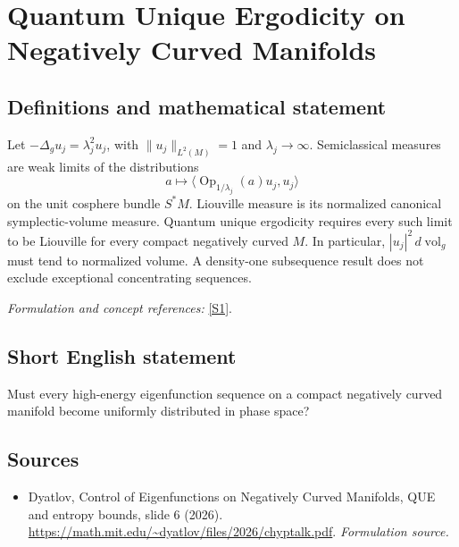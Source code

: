 \documentclass[11pt]{article}
\begin{document}
\section*{\texorpdfstring{Quantum Unique Ergodicity on Negatively Curved Manifolds}{Quantum Unique Ergodicity on Negatively Curved Manifolds}}\label{statement}
\subsection{Definitions and mathematical statement}
Let $-\Delta_g u_j=\lambda_j^2u_j$, with $\|u_j\|_{L^2(M)}=1$ and $\lambda_j\to\infty$. Semiclassical measures are weak limits of the distributions
\[
 a\longmapsto\langle\operatorname{Op}_{1/\lambda_j}(a)u_j,u_j\rangle
\]
on the unit cosphere bundle $S^*M$. Liouville measure is its normalized canonical symplectic-volume measure. Quantum unique ergodicity requires every such limit to be Liouville for every compact negatively curved $M$. In particular, $|u_j|^2\,d\operatorname{vol}_g$ must tend to normalized volume. A density-one subsequence result does not exclude exceptional concentrating sequences.
\par\smallskip\textit{Formulation and concept references:} \href{https://math.mit.edu/~dyatlov/files/2026/chyptalk.pdf}{[S1]}.

\subsection{Short English statement}
Must every high-energy eigenfunction sequence on a compact negatively curved manifold become uniformly distributed in phase space?
\subsection{Sources}
\begin{itemize}
\item[S1]Dyatlov, Control of Eigenfunctions on Negatively Curved Manifolds, QUE and entropy bounds, slide 6 (2026).
\url{https://math.mit.edu/~dyatlov/files/2026/chyptalk.pdf}.
\textit{Formulation source.}
\end{itemize}
\end{document}
